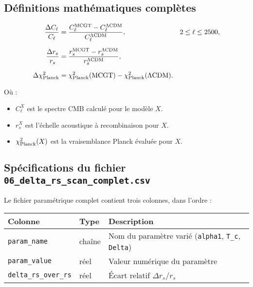 \subsection{Définitions mathématiques complètes}

\begin{align}
  \frac{\Delta C_{\ell}}{C_{\ell}}
  &= \frac{C_{\ell}^{\mathrm{MCGT}} - C_{\ell}^{\Lambda\rm CDM}}
           {C_{\ell}^{\Lambda\rm CDM}},
  & 2 \le \ell \le 2500, \\[6pt]
  \frac{\Delta r_{s}}{r_{s}}
  &= \frac{r_{s}^{\mathrm{MCGT}} - r_{s}^{\Lambda\rm CDM}}
           {r_{s}^{\Lambda\rm CDM}}, \\[6pt]
  \Delta\chi^{2}_{\rm Planck}
  &= \chi^{2}_{\rm Planck}(\mathrm{MCGT})
   - \chi^{2}_{\rm Planck}(\Lambda\mathrm{CDM}).
\end{align}

\noindent
Où :
\begin{itemize}
  \item \(C_{\ell}^{X}\) est le spectre CMB calculé pour le modèle \(X\).  
  \item \(r_{s}^{X}\) est l’échelle acoustique à recombinaison pour \(X\).  
  \item \(\chi^{2}_{\rm Planck}(X)\) est la vraisemblance Planck évaluée pour \(X\).
\end{itemize}

\subsection{Spécifications du fichier \texttt{06\_delta\_rs\_scan\_complet.csv}}

Le fichier paramétrique complet contient trois colonnes, dans l’ordre :
\begin{center}
\begin{tabular}{l l l}
\toprule
\textbf{Colonne}     & \textbf{Type} & \textbf{Description}                               \\
\midrule
\texttt{param\_name} & chaîne        & Nom du paramètre varié (\texttt{alpha1}, \texttt{T\_c}, \texttt{Delta}) \\
\texttt{param\_value}& réel          & Valeur numérique du paramètre                     \\
\texttt{delta\_rs\_over\_rs} & réel    & Écart relatif \(\Delta r_{s}/r_{s}\)                \\
\bottomrule
\end{tabular}
\end{center} 

